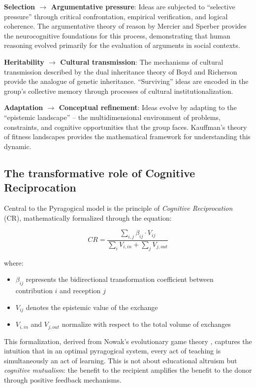 \textbf{Selection $\rightarrow$ Argumentative pressure}: Ideas are subjected to ``selective pressure'' through critical confrontation, empirical verification, and logical coherence. The argumentative theory of reason by Mercier and Sperber \cite{Mercier2017} provides the neurocognitive foundations for this process, demonstrating that human reasoning evolved primarily for the evaluation of arguments in social contexts.

\textbf{Heritability $\rightarrow$ Cultural transmission}: The mechanisms of cultural transmission described by the dual inheritance theory of Boyd and Richerson \cite{Boyd2005} provide the analogue of genetic inheritance. ``Surviving'' ideas are encoded in the group's collective memory through processes of cultural institutionalization.

\textbf{Adaptation $\rightarrow$ Conceptual refinement}: Ideas evolve by adapting to the ``epistemic landscape'' -- the multidimensional environment of problems, constraints, and cognitive opportunities that the group faces. Kauffman's theory of fitness landscapes \cite{Kauffman1993} provides the mathematical framework for understanding this dynamic.

\subsection{The transformative role of Cognitive Reciprocation}

Central to the Pyragogical model is the principle of \textit{Cognitive Reciprocation} (CR), mathematically formalized through the equation:

\begin{equation}
	CR = \frac{\sum_{i,j} \beta_{ij} \cdot V_{ij}}{\sum_{i} V_{i,in} + \sum_{j} V_{j,out}}
	\label{eq:reciprocazione}
\end{equation}

where:
\begin{itemize}
	\item $\beta_{ij}$ represents the bidirectional transformation coefficient between contribution $i$ and reception $j$
	\item $V_{ij}$ denotes the epistemic value of the exchange
	\item $V_{i,in}$ and $V_{j,out}$ normalize with respect to the total volume of exchanges
\end{itemize}

This formalization, derived from Nowak's evolutionary game theory \cite{Nowak2006}, captures the intuition that in an optimal pyragogical system, every act of teaching is simultaneously an act of learning. This is not about educational altruism but \textit{cognitive mutualism}: the benefit to the recipient amplifies the benefit to the donor through positive feedback mechanisms.

